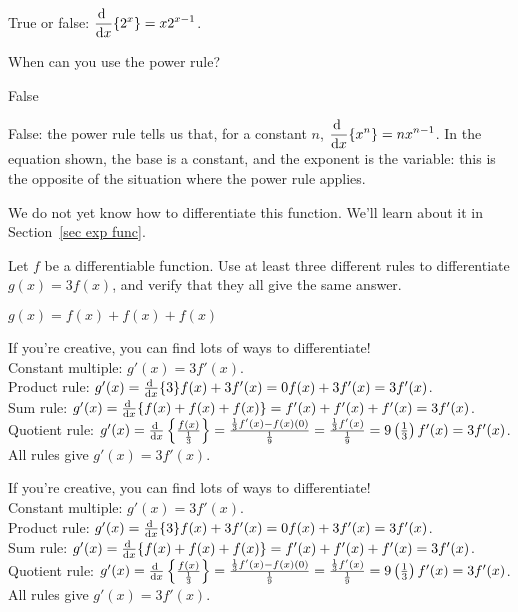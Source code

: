 \begin{Mquestion}
True or false: $\ds\diff{}{x}\{2^x\}=x2^{x-1}$.
\end{Mquestion}
\begin{hint} When can you use the power rule?
\end{hint}
\begin{answer} False
\end{answer}
\begin{solution}
False: the power rule tells us that, for a constant $n$, $\ds\diff{}{x}\{x^n\}=nx^{n-1}$. In the equation shown, the base is a constant, and the exponent is the variable: this is the opposite of the situation where the power rule applies.

We do not yet know how to differentiate this function. We'll learn about it in Section~\ref*{sec exp func}.
\end{solution}

\begin{question}Let $f$ be a differentiable function. Use at least three different rules to differentiate\\ $g(x)=3f(x)$, and verify that they all give the same answer.
\end{question}
\begin{hint} $g(x)=f(x)+f(x)+f(x)$
\end{hint}
\begin{answer} If you're creative, you can find lots of ways to differentiate!\\
Constant multiple: $g'(x)=3f'(x)$.\\
Product rule: $g'(x) = \diff{}{x}\{3\}f(x)+3f'(x)=0f(x)+3f'(x)=3f'(x)$.\\
Sum rule: $g'(x)=\diff{}{x}\{f(x)+f(x)+f(x)\}=f'(x)+f'(x)+f'(x)=3f'(x)$.\\
Quotient rule: $g'(x)=\diff{}{x}\left\{\frac{f(x)}{\frac{1}{3}}\right\}=
\frac{\frac{1}{3}f'(x)-f(x)(0)}{\frac{1}{9}}=\frac{\frac{1}{3}f'(x)}{\frac{1}{9}}=9\left(\frac{1}{3}\right)f'(x)=3f'(x)$.\\
All rules give $g'(x)=3f'(x)$.
\end{answer}
\begin{solution} If you're creative, you can find lots of ways to differentiate!\\
Constant multiple: $g'(x)=3f'(x)$.\\
Product rule: $g'(x) = \diff{}{x}\{3\}f(x)+3f'(x)=0f(x)+3f'(x)=3f'(x)$.\\
Sum rule: $g'(x)=\diff{}{x}\{f(x)+f(x)+f(x)\}=f'(x)+f'(x)+f'(x)=3f'(x)$.\\
Quotient rule: $g'(x)=\diff{}{x}\left\{\frac{f(x)}{\frac{1}{3}}\right\}=
\frac{\frac{1}{3}f'(x)-f(x)(0)}{\frac{1}{9}}=\frac{\frac{1}{3}f'(x)}{\frac{1}{9}}=9\left(\frac{1}{3}\right)f'(x)=3f'(x)$.\\
All rules give $g'(x)=3f'(x)$.
\end{solution}



